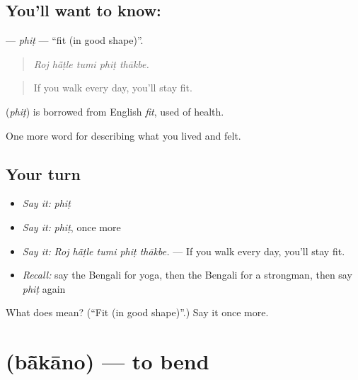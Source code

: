 \subsection*{You'll want to know: }
\textbf{} — \emph{phiṭ} — \textquotedblleft{}fit (in good shape)\textquotedblright{}.

\begin{quote}
    
\end{quote}

\begin{quote}
\emph{Roj hā̃ṭle tumi phiṭ thākbe.}
\end{quote}

\begin{quote}
If you walk every day, you'll stay fit.
\end{quote}

\begin{cousinweb}
\textbf{} (\emph{phiṭ}) is borrowed from English \emph{fit}, used of health.
\end{cousinweb}

\begin{grammarlens}[title={What you've built}]
One more word for describing what you lived and felt.
\end{grammarlens}

\subsection*{Your turn}
\begin{itemize}
\raggedright
  \item \emph{Say it:} \emph{phiṭ}
  \item \emph{Say it:} \emph{phiṭ}, once more
  \item \emph{Say it:} \emph{Roj hā̃ṭle tumi phiṭ thākbe.} — If you walk every day, you'll stay fit.
  \item \emph{Recall:} say the Bengali for yoga, then the Bengali for a strongman, then say \emph{phiṭ} again
\end{itemize}

\begin{tcolorbox}[breakable,colback=teal!4,colframe=teal!35!black,title={Before you move on}]
What does  mean? (\textquotedblleft{}Fit (in good shape)\textquotedblright{}.) Say it once more.
\end{tcolorbox}
\section[\texorpdfstring{\bn{বাঁকানো} (bā̃kāno)}{বাঁকানো (bā̃kāno)}]{ (bā̃kāno) — to bend}

